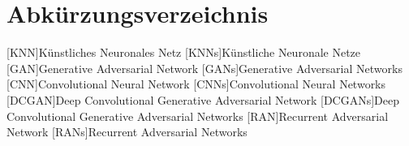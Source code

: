 \chapter*{Abkürzungsverzeichnis} 
\begin{acronym}
[KNN]{Künstliches Neuronales Netz}
[KNNs]{Künstliche Neuronale Netze}
[GAN]{Generative Adversarial Network}
[GANs]{Generative Adversarial Networks}
[CNN]{Convolutional Neural Network}
[CNNs]{Convolutional Neural Networks}
[DCGAN]{Deep Convolutional Generative Adversarial Network}
[DCGANs]{Deep Convolutional Generative Adversarial Networks}
[RAN]{Recurrent Adversarial Network}
[RANs]{Recurrent Adversarial Networks}
\end{acronym}
